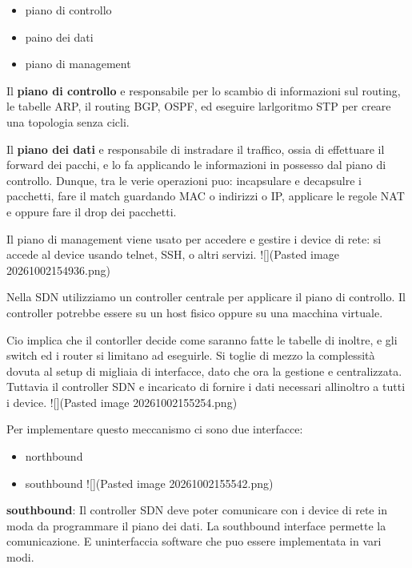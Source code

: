 \begin{itemize}
\tightlist
\item
  piano di controllo
\item
  paino dei dati
\item
  piano di management
\end{itemize}

Il \textbf{piano di controllo} e\textquotesingle{} responsabile per lo
scambio di informazioni sul routing, le tabelle ARP, il routing BGP,
OSPF, ed eseguire l\textquotesingle arlgoritmo STP per creare una
topologia senza cicli.

Il \textbf{piano dei dati} e\textquotesingle{} responsabile di
instradare il traffico, ossia di effettuare il forward dei pacchi, e lo
fa applicando le informazioni in possesso dal piano di controllo.
Dunque, tra le verie operazioni puo: incapsulare e decapsulre i
pacchetti, fare il match guardando MAC o indirizzi o IP, applicare le
regole NAT e oppure fare il drop dei pacchetti.

Il piano di management viene usato per accedere e gestire i device di
rete: si accede al device usando telnet, SSH, o altri servizi.
!{[}{]}(Pasted image 20261002154936.png)

Nella SDN utilizziamo un controller centrale per applicare il piano di
controllo. Il controller potrebbe essere su un host fisico oppure su una
macchina virtuale.

Cio\textquotesingle{} implica che il contorller decide come saranno
fatte le tabelle di inoltre, e gli switch ed i router si limitano ad
eseguirle. Si toglie di mezzo la complessità dovuta al setup di migliaia
di interfacce, dato che ora la gestione e\textquotesingle{}
centralizzata. Tuttavia il controller SDN e\textquotesingle{} incaricato
di fornire i dati necessari all\textquotesingle inoltro a tutti i
device. !{[}{]}(Pasted image 20261002155254.png)

Per implementare questo meccanismo ci sono due interfacce:

\begin{itemize}
\tightlist
\item
  northbound
\item
  southbound !{[}{]}(Pasted image 20261002155542.png)
\end{itemize}

\textbf{southbound}: Il controller SDN deve poter comunicare con i
device di rete in moda da programmare il piano dei dati. La southbound
interface permette la comunicazione. E\textquotesingle{}
un\textquotesingle interfaccia software che puo\textquotesingle{} essere
implementata in vari modi.

